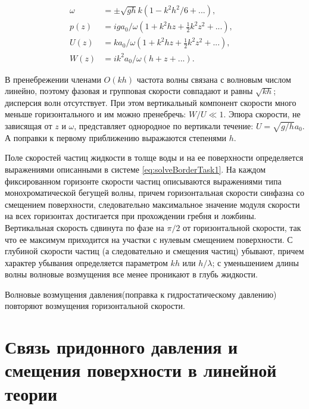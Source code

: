 
\begin{align}\label{eq:longWavesSolve}
   \omega &= \pm\sqrt{gh}k(1-k^2h^2/6+...), &\\
   p(z)&=iga_0/\omega(1+k^2hz+\frac{1}{2}k^2z^2+...), &\\
   U(z)&=ka_0/\omega(1+k^2hz+\frac{1}{2}k^2z^2+...), &\\
   W(z)&=ik^2a_0/\omega(h+z+...). &
 \end{align}

В пренебрежении членами $O(kh)$ частота волны связана с волновым числом линейно, поэтому фазовая и групповая скорости совпадают и равны $\sqrt{kh}$; дисперсия волн отсутствует. При этом вертикальный компонент скорости много меньше горизонтального и им можно пренебречь: $W/U\ll1$. Эпюра скорости, не зависящая от $z$ и $\omega$, представляет однородное по вертикали течение: $U=\sqrt{g/h}a_0$. А поправки к первому приближению выражаются степенями $h$.

Поле скоростей частиц жидкости в толще воды и на ее поверхности определяется выражениями описанными в системе \eqref{eq:solveBorderTask1}. На каждом фиксированном горизонте скорости частиц описываются выражениями типа монохроматической бегущей волны, причем горизонтальная скорости синфазна со смещением поверхности, следовательно максимальное значение модуля скорости на всех горизонтах достигается при прохождении гребня и ложбины. Вертикальная скорость сдвинута по фазе на $\pi/2$ от горизонтальной скорости, так что ее максимум приходится на участки с нулевым смещением поверхности. С глубиной скорости частиц (а следовательно и смещения частиц) убывают, причем характер убывания определяется параметром $kh$ или $h/\lambda$; с уменьшением длины волны волновые возмущения все менее проникают в глубь жидкости.

Волновые возмущения давления(поправка к гидростатическому давлению) повторяют возмущения горизонтальной скорости.

\section{Связь придонного давления и смещения поверхности в линейной теории}\label{relationPart1}

